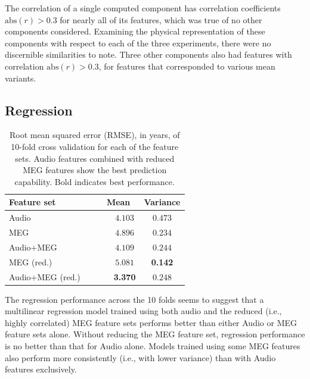 \documentclass[utf8]{frontiersSCNS} %
\begin{document}
The correlation of a single computed component has correlation coefficients $\text{abs}(r)>0.3$ for nearly all of its features, which was true of no other components considered. Examining the physical representation of these components with respect to each of the three experiments, there were no discernible similarities to note. Three other components also had features with correlation $\text{abs}(r)>0.3$, for features that corresponded to various mean variants.

\subsection{Regression}

\begin{table}[t]
  \centering
  \label{tab:reg_results}
  \begin{tabular}{| l | c | c |}
    \toprule
    \multicolumn{1}{l}{\textbf{Feature set}} & \multicolumn{1}{c}{\textbf{Mean}} & \multicolumn{1}{c}{\textbf{Variance}} \\
    \toprule
        Audio~~~                             & ~~~$4.103$         &     $0.473$       \\
        MEG~~~                               & ~~~$4.896$         &     $0.234$       \\
        Audio+MEG~~~                         & ~~~$4.109$         &     $0.244$       \\

        \midrule
       
        MEG (red.)~~~                        & ~~~$5.081$         &     \textbf{0.142}       \\
        Audio+MEG (red.)~~~                  & ~~~\textbf{3.370}         &     $0.248$       \\

        \bottomrule
  \end{tabular}
  \caption{Root mean squared error (RMSE), in years, of 10-fold cross validation for each of the feature sets. Audio features combined with reduced MEG features show the best prediction capability. Bold indicates best performance.}
\end{table}

The regression performance across the 10 folds seems to suggest that a multilinear regression model trained using both audio and the reduced (i.e., highly correlated) MEG feature sets performs better than either Audio or MEG feature sets alone. Without  reducing the MEG feature set, regression performance is no better than that for Audio alone. Models trained using some MEG features also  perform more consistently (i.e., with lower variance) than with Audio features exclusively.
\end{document}
